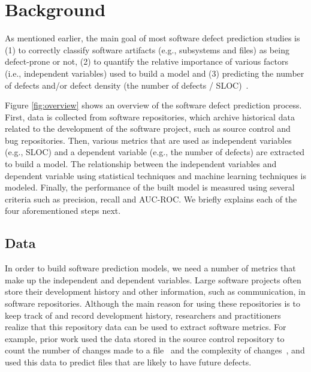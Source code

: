\section{Background} \label{background}

As mentioned earlier, the main goal of most software defect prediction studies is (1) to correctly classify software artifacts (e.g., subsystems and files) as being defect-prone or not, (2) to quantify the relative importance of various factors (i.e., independent variables) used to build a model and (3) predicting the number of defects and/or defect density (the number of defects / SLOC)~\cite{Shihab2012PhD}.


Figure \ref{fig:overview} shows an overview of the software defect prediction process. First, data is collected from software repositories, which archive historical data related to the development of the software project, such as source control and bug repositories. Then, various metrics that are used as independent variables (e.g., SLOC) and a dependent variable (e.g., the number of defects)  are extracted to build a model. The relationship between the independent variables and dependent variable using statistical techniques and machine learning techniques is modeled.  Finally, the performance of the built model is measured using several criteria such as precision, recall and AUC-ROC. We briefly explains each of the four aforementioned steps next.

\subsection{Data}
In order to build software prediction models, we need a number of metrics that make up the independent and dependent variables. Large software projects often store their development history and other information, such as communication, in software repositories. Although the main reason for using these repositories is to keep track of and record development history, researchers and practitioners realize that this repository data can be used to extract software metrics. For example, prior work used the data stored in the source control repository to count the number of changes made to a file~\cite{Zimmermann2007PROMISE} and the complexity of changes~\cite{Hassan2009ICSE}, and used this data to predict files that are likely to have future defects.

